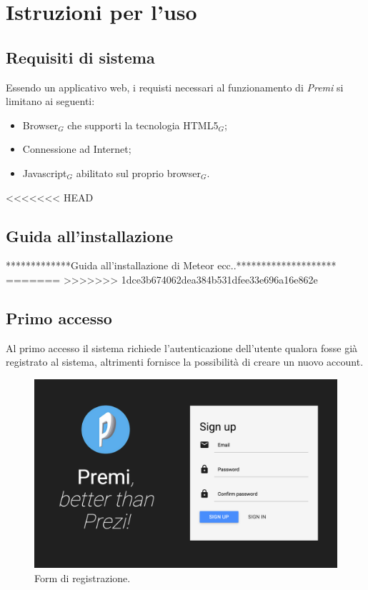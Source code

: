 \section{Istruzioni per l'uso}
\subsection{Requisiti di sistema}
Essendo un applicativo web, i requisti necessari al funzionamento di \emph{Premi} si limitano ai seguenti:
\begin{itemize}
\item Browser$_G$ che supporti la tecnologia HTML5$_G$;
\item Connessione ad Internet;
\item Javascript$_G$ abilitato sul proprio browser$_G$.
\end{itemize}
<<<<<<< HEAD

\subsection{Guida all'installazione}
*************Guida all'installazione di Meteor ecc..********************
=======
>>>>>>> 1dce3b674062dea384b531dfee33e696a16e862e

\subsection{Primo accesso}
Al primo accesso il sistema richiede l'autenticazione dell'utente qualora fosse già registrato al sistema, altrimenti fornisce la possibilità di creare un nuovo account.
\begin{figure}[h]
\begin{center}
\includegraphics[scale=0.4]{img/signup.png}
\caption{Form di registrazione.}
\end{center}
\end{figure}

